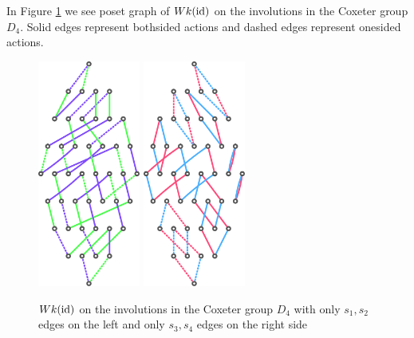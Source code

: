 \begin{exam}
	In Figure \ref{fig:d4_s1s2-and-d4_s3s4} we see poset graph of $Wk(\operatorname{id})$ on the involutions in the Coxeter group $D_4$. Solid edges represent bothsided actions and dashed edges represent onesided actions.
	\begin{figure}
		\centering
		\includegraphics[width=0.3\textwidth]{resources/d4_s1s2}
		\quad \quad \quad
		\includegraphics[width=0.3\textwidth]{resources/d4_s3s4}
		\caption{$Wk(\operatorname{id})$ on the involutions in the Coxeter group $D_4$ with only $s_1,s_2$ edges on the left and only $s_3,s_4$ edges on the right side}
		\label{fig:d4_s1s2-and-d4_s3s4}
	\end{figure}
\end{exam}